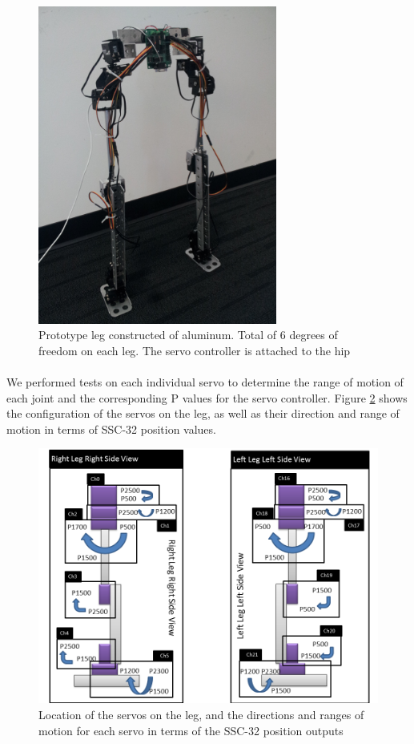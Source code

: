 \documentclass[titlepage,letterpaper,12pt]{article}
\begin{document}
\begin{figure}
  \centering
    \includegraphics[width=0.7\textwidth,angle=270]{figures/LegPrototype.jpg}
  \caption{Prototype leg constructed of aluminum. Total of 6 degrees of freedom
  on each leg. The servo controller is attached to the hip}
  \label{protolegfig}
\end{figure}

\paragraph{}We performed tests on each individual servo to determine the range
of motion of each joint and the corresponding P values for the servo controller.
Figure \ref{servosetupfig} shows the configuration of the servos on the leg, as
well as their direction and range of motion in terms of SSC-32 position values.

\begin{figure}
  \centering
    \includegraphics[width=1.0\textwidth]{figures/LegConfiguration.png}
  \caption{Location of the servos on the leg, and the directions and ranges of
  motion for each servo in terms of the SSC-32 position outputs}
  \label{servosetupfig}
\end{figure}
\end{document}
